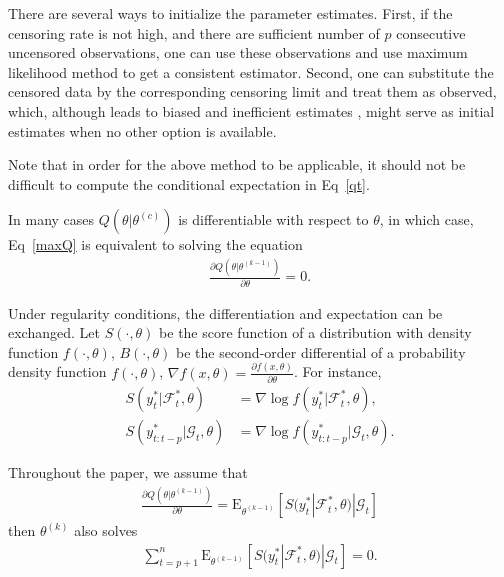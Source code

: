 \documentclass[a4paper,12pt]{article}
\newcommand{\E}{\mathop{\mathbb{E}}}
\def \E{\mbox{E}}
\def \F {\mathcal{F}}
\def \G {\mathcal{G}}
\newenvironment{remark}[1][Remark]{\begin{trivlist}
\item[\hskip \labelsep {\bfseries #1}]}{\end{trivlist}}
\begin{document}
\begin{remark}
There are several ways to initialize the parameter estimates.
First, if the censoring rate is not high,
and there are sufficient number of $p$ consecutive uncensored observations,
one can use these observations and use maximum likelihood method to get a consistent estimator.
Second, one can substitute the censored data by the corresponding censoring limit and treat them as observed,
which, although leads to biased and inefficient estimates \citep{ParkGentonGhosh2007},
might serve as initial estimates when no other option is available.
\end{remark}



Note that in order for the above method to be applicable,
it should not be difficult to compute the conditional expectation in Eq~\eqref{qt}.

In many cases $Q(\theta|\theta^{(c)})$ is differentiable with respect to $\theta$, in which case, Eq~\eqref{maxQ} is equivalent to solving the equation
\begin{align}
\frac{\partial Q(\theta|\theta^{(k-1)})}{\partial \theta} = 0.
\label{zEqn}
\end{align}

Under regularity conditions, the differentiation and expectation can be exchanged.
Let $S(\cdot,\theta)$ be the score function of a distribution with density function $f(\cdot,\theta)$, 
$B(\cdot,\theta)$ be the second-order differential of a probability density function $f(\cdot,\theta)$,
$\nabla f(x,\theta) = \frac{\partial f(x,\theta)}{\partial \theta}$.
For instance, 
\begin{align*}
S(y_t^*|\F_t^*,\theta) &= \nabla \log f(y_t^*|\F_t^*,\theta),\\
S(y_{t:t-p}^*|\G_t,\theta) &= \nabla \log f(y_{t:t-p}^*|\G_t,\theta).
\end{align*}

Throughout the paper, we assume that 
\begin{align*}
  \frac{\partial Q(\theta|\theta^{(k-1)})}{\partial \theta}
  = \E_{\theta^{(k-1)}}\left[S(y_t^*|\F_t^*,\theta)|\G_t\right]
\end{align*}
then $\theta^{(k)}$ also solves  
\begin{align}
\sum_{t=p+1}^n \E_{\theta^{(k-1)}}\left[  S(y_t^*|\F_t^*,\theta)|\G_t \right]= 0.
\label{zEqn2}
\end{align}
\end{document}
